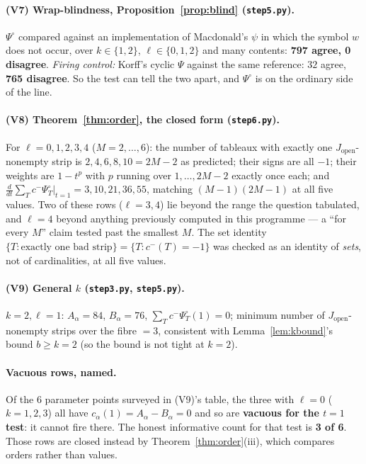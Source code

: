 \documentclass[11pt]{article}
\theoremstyle{plain}
\theoremstyle{definition}
\newcommand{\Jop}{J_{\mathrm{open}}}
\newcommand{\Psiop}{\Psi^{\circ}}
\begin{document}
\paragraph{(V7) Wrap-blindness, Proposition~\ref{prop:blind} (\texttt{step5.py}).}
$\Psiop$ compared against an implementation of Macdonald's $\psi$ in which the symbol $w$ does
not occur, over $k\in\{1,2\}$, $\ell\in\{0,1,2\}$ and many contents: \textbf{797 agree, 0
disagree}. \emph{Firing control:} Korff's cyclic $\Psi$ against the same reference:
$32$ agree, \textbf{765 disagree}. So the test can tell the two apart, and $\Psiop$ is on the
ordinary side of the line.

\paragraph{(V8) Theorem~\ref{thm:order}, the closed form (\texttt{step6.py}).}
For $\ell=0,1,2,3,4$ ($M=2,\dots,6$): the number of tableaux with exactly one $\Jop$-nonempty
strip is $2,4,6,8,10=2M-2$ as predicted; their signs are all $-1$; their weights are
$1-t^p$ with $p$ running over $1,\dots,2M-2$ exactly once each; and
$\frac{d}{dt}\sum_Tc^-\Psiop_T\big|_{t=1}=3,10,21,36,55$, matching $(M-1)(2M-1)$ at all five
values. Two of these rows ($\ell=3,4$) lie beyond the range the question tabulated, and $\ell=4$
beyond anything previously computed in this programme --- a ``for every $M$'' claim tested past
the smallest $M$.
The set identity $\{T:\text{exactly one bad strip}\}=\{T:c^-(T)=-1\}$ was checked as an identity
of \emph{sets}, not of cardinalities, at all five values.

\paragraph{(V9) General $k$ (\texttt{step3.py}, \texttt{step5.py}).}
$k=2,\ell=1$: $A_\alpha=84$, $B_\alpha=76$, $\sum_Tc^-\Psiop_T(1)=0$; minimum number of
$\Jop$-nonempty strips over the fibre $=3$, consistent with Lemma~\ref{lem:kbound}'s bound
$b\ge k=2$ (so the bound is not tight at $k=2$).

\paragraph{Vacuous rows, named.} Of the $6$ parameter points surveyed in (V9)'s table,
the three with $\ell=0$ ($k=1,2,3$) all have $c_\alpha(1)=A_\alpha-B_\alpha=0$ and so are
\textbf{vacuous for the $t=1$ test}: it cannot fire there. The honest informative count for that
test is \textbf{3 of 6}. Those rows are closed instead by Theorem~\ref{thm:order}(iii), which
compares orders rather than values.
\end{document}
